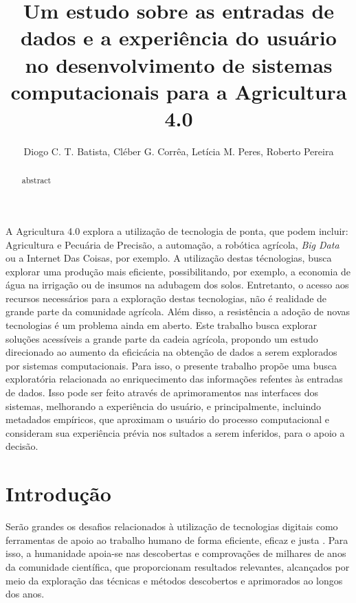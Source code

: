 \documentclass[12pt]{article}
\title{Um estudo sobre as entradas de dados e a experiência do usuário no desenvolvimento de sistemas computacionais para a Agricultura 4.0}
\author{Diogo C. T. Batista\inst{1}, Cléber G. Corrêa\inst{1}, Letícia M. Peres\inst{2}, Roberto Pereira\inst{2}}
\begin{document}
 

\maketitle

\begin{abstract}
  abstract
\end{abstract}
     
\begin{resumo} 
	A Agricultura 4.0 explora a utilização de tecnologia de ponta, que podem incluir: Agricultura e Pecuária de Precisão, a automação, a robótica agrícola, \textit{Big Data} ou a Internet Das Coisas, por exemplo. A utilização destas técnologias, busca explorar uma produção mais eficiente, possibilitando, por exemplo, a economia de água na irrigação ou de insumos na adubagem dos solos. Entretanto, o acesso aos recursos necessários para a exploração destas tecnologias, não é realidade de grande parte da comunidade agrícola. Além disso, a resistência a adoção de novas tecnologias é um problema ainda em aberto. Este trabalho busca explorar soluções acessíveis a grande parte da cadeia agrícola, propondo um estudo direcionado ao aumento da eficicácia na obtenção de dados a serem explorados por sistemas computacionais. Para isso, o presente trabalho propõe uma busca exploratória relacionada ao enriquecimento das informações refentes às entradas de dados. Isso pode ser feito através de aprimoramentos nas interfaces dos sistemas, melhorando a experiência do usuário, e principalmente, incluindo metadados empíricos, que aproximam o usuário do processo computacional e consideram sua experiência prévia nos sultados a serem inferidos, para o apoio a decisão.
\end{resumo}

\section{Introdução}

Serão grandes os desafios relacionados à utilização de tecnologias digitais como ferramentas de apoio ao trabalho humano de forma eficiente, eficaz e justa \cite{agriculture-40-rose}. Para isso, a humanidade apoia-se nas descobertas e comprovações de milhares de anos da comunidade científica, que proporcionam resultados relevantes, alcançados por meio da exploração das técnicas e métodos descobertos e aprimorados ao longos dos anos.
\end{document}
